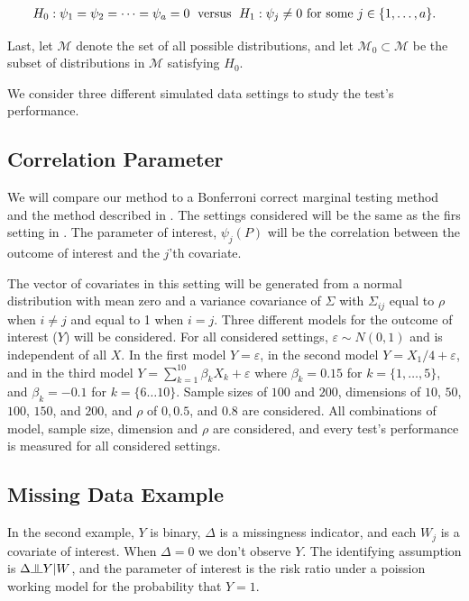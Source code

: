 \documentclass{article}
\newcommand{\indep}{\raisebox{0.05em}{\rotatebox[origin=c]{90}{$\models$}}}
\begin{document}
\begin{align*}
H_0: \psi_1 = \psi_2 = \dots = \psi_a = 0 \hspace{0.1cm}\text{  versus  } \hspace{0.1cm} H_1: \psi_j \neq 0 \text{ for some } j \in \{1, \dots, a\}.
\end{align*}

Last, let $\mathscr{M}$ denote the set of all possible distributions, and let $\mathscr{M}_0  \subset \mathscr{M}$ be the subset of distributions in $\mathscr{M}$ satisfying $H_0$.

We consider three different simulated data settings to study the test's performance. 

\subsection{Correlation Parameter}
We will compare our method to a Bonferroni correct marginal testing method and the method described in \citep{zhang_comment_2015}.  The settings considered will be the same as the firs setting in \citep{mckeague_adaptive_2015}.  The parameter of interest, $\psi_j(P)$ will be the correlation between the outcome of interest and the $j$'th covariate. 

The vector of covariates in this setting will be generated from a normal distribution with mean zero and a variance covariance of $\Sigma$ with $\Sigma_{ij}$ equal to $\rho$ when $i \neq j$ and equal to 1 when $i = j$. Three different models for the outcome of interest ($Y$) will be considered. For all considered settings, $\varepsilon \sim N(0, 1)$ and is independent of all $X$. In the first model $Y = \varepsilon$, in the second model $Y = X_1 / 4 + \varepsilon$, and in the third model $Y = \sum_{k = 1}^{10} \beta_k X_k + \varepsilon$ where $\beta_k = 0.15$ for $k = \{1, \dots, 5\}$, and $\beta_k = -0.1$ for $k = \{6 \dots 10\}$.  Sample sizes of $100$ and $200$, dimensions of $10$, $50$, $100$, $150$, and $200$, and $\rho$ of  $0, 0.5$, and $0.8$ are considered.  All combinations of model, sample size, dimension and $\rho$ are considered, and every test's performance is measured for all considered settings.

\subsection{Missing Data Example}
In the second example, $Y$ is binary, $\Delta$ is a missingness indicator, and each $W_j$ is a covariate of interest.  When $\Delta = 0$ we don't observe $Y$.  The identifying assumption is $\Delta \indep Y | W$, and the parameter of interest is the risk ratio under a poission working model for the probability that $Y = 1$.
\end{document}
